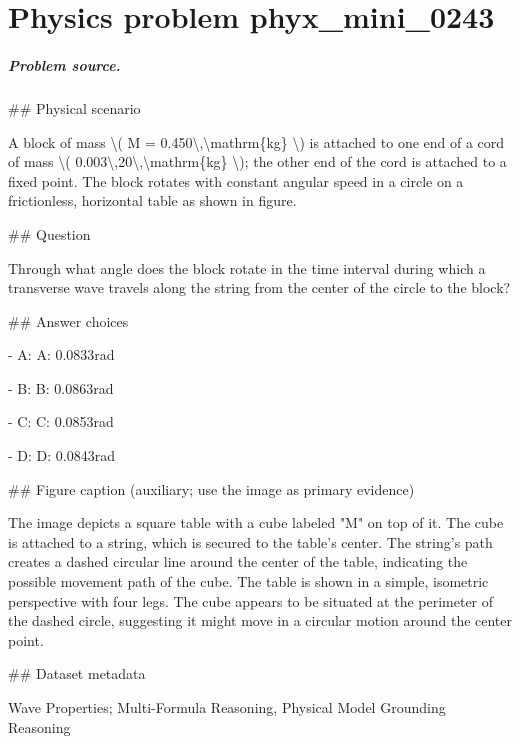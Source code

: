 
\chapter{Physics problem phyx\_mini\_0243}
\label{ch:PhyXMiniProblems_problem_phyx_mini_0243}

\paragraph{Problem source.}
\#\# Physical scenario

A block of mass \textbackslash{}( M = 0.450\textbackslash{},\textbackslash{}mathrm\{kg\} \textbackslash{}) is attached to one end of a cord of mass \textbackslash{}( 0.003\textbackslash{},20\textbackslash{},\textbackslash{}mathrm\{kg\} \textbackslash{}); the other end of the cord is attached to a fixed point. The block rotates with constant angular speed in a circle on a frictionless, horizontal table as shown in figure.

\#\# Question

Through what angle does the block rotate in the time interval during which a transverse wave travels along the string from the center of the circle to the block?

\#\# Answer choices

- A: A: 0.0833rad

- B: B: 0.0863rad

- C: C: 0.0853rad

- D: D: 0.0843rad

\#\# Figure caption (auxiliary; use the image as primary evidence)

The image depicts a square table with a cube labeled "M" on top of it. The cube is attached to a string, which is secured to the table's center. The string's path creates a dashed circular line around the center of the table, indicating the possible movement path of the cube. The table is shown in a simple, isometric perspective with four legs. The cube appears to be situated at the perimeter of the dashed circle, suggesting it might move in a circular motion around the center point.

\#\# Dataset metadata

Wave Properties; Multi-Formula Reasoning, Physical Model Grounding Reasoning

